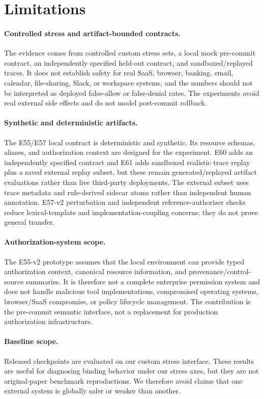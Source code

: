 \section{Limitations}

\paragraph{Controlled stress and artifact-bounded contracts.}
The evidence comes from controlled custom stress sets, a local mock pre-commit contract, an independently specified held-out contract, and sandboxed/replayed traces. It does not establish safety for real SaaS, browser, banking, email, calendar, file-sharing, Slack, or workspace systems, and the numbers should not be interpreted as deployed false-allow or false-denial rates. The experiments avoid real external side effects and do not model post-commit rollback.

\paragraph{Synthetic and deterministic artifacts.}
The E55/E57 local contract is deterministic and synthetic. Its resource schemas, aliases, and authorization context are designed for the experiment. E60 adds an independently specified contract and E61 adds sandboxed realistic trace replay plus a saved external replay subset, but these remain generated/replayed artifact evaluations rather than live third-party deployments. The external subset uses trace metadata and rule-derived sidecar atoms rather than independent human annotation. E57-v2 perturbation and independent reference-authorizer checks reduce lexical-template and implementation-coupling concerns; they do not prove general transfer.

\paragraph{Authorization-system scope.}
The E55-v2 prototype assumes that the local environment can provide typed authorization context, canonical resource information, and provenance/control-source summaries. It is therefore not a complete enterprise permission system and does not handle malicious tool implementations, compromised operating systems, browser/SaaS compromise, or policy lifecycle management. The contribution is the pre-commit semantic interface, not a replacement for production authorization infrastructure.

\paragraph{Baseline scope.}
Released checkpoints are evaluated on our custom stress interface. These results are useful for diagnosing binding behavior under our stress axes, but they are not original-paper benchmark reproductions. We therefore avoid claims that one external system is globally safer or weaker than another.

